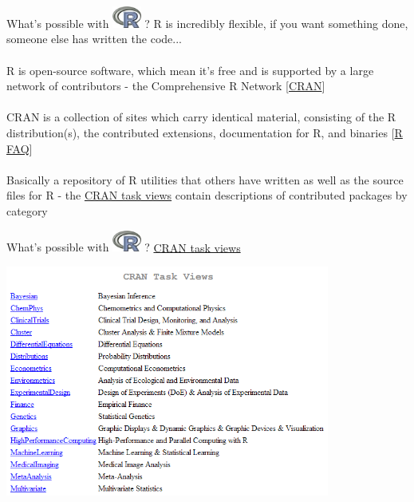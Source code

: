 \documentclass[xcolor=svgnames]{beamer}\usepackage[]{graphicx}\usepackage[]{color}
\begin{document}
\begin{frame}{What's possible with \includegraphics[width=0.07\textwidth]{Rlogo.jpg} \hspace{0.2em}? }
R is incredibly flexible, if you want something done, someone else has written the code...\\~\\
R is open-source software, which mean it's free and is supported by a large network of contributors - the Comprehensive R Network [\href{http://cran.us.r-project.org/}{CRAN}]\\~\\
CRAN is a collection of sites which carry identical material, consisting of the R distribution(s), the contributed extensions, documentation for R, and binaries [\href{http://cran.us.r-project.org/faqs.html}{R FAQ}]\\~\\
Basically a repository of R utilities that others have written as well as the source files for R - the \href{http://cran.r-project.org/web/views/}{CRAN task views} contain descriptions of contributed packages by category
\end{frame}

\begin{frame}[t]{What's possible with \includegraphics[width=0.07\textwidth]{Rlogo.jpg} \hspace{0.2em}? }
\href{http://cran.r-project.org/web/views/}{CRAN task views}
\begin{center}
\includegraphics[width = 0.8\textwidth]{cran_view1.png}
\end{center}
\end{frame}
\end{document}
